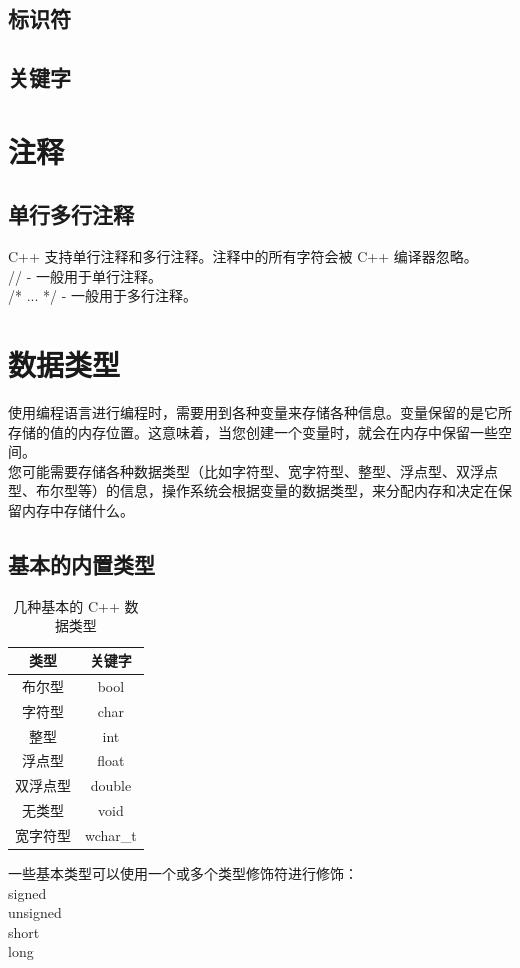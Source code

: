 \documentclass[12pt,twiside,a4paper]{ctexbook}
\numberwithin{chapter}{part}
\begin{document}
\section{标识符}

\section{关键字}

\chapter{注释}
\section{单行多行注释}
C++ 支持单行注释和多行注释。注释中的所有字符会被 C++ 编译器忽略。\\
// - 一般用于单行注释。\\
/* ... */ - 一般用于多行注释。

\chapter{数据类型}
使用编程语言进行编程时，需要用到各种变量来存储各种信息。变量保留的是它所存储的值的内存位置。这意味着，当您创建一个变量时，就会在内存中保留一些空间。\\
您可能需要存储各种数据类型（比如字符型、宽字符型、整型、浮点型、双浮点型、布尔型等）的信息，操作系统会根据变量的数据类型，来分配内存和决定在保留内存中存储什么。
\section{基本的内置类型}
\begin{table}[h]
    \centering
    \caption{几种基本的 C++ 数据类型}
    \label{tab:example}
    \begin{tabular}{|c|c|}
    \hline
    \textbf{类型} & \textbf{关键字}\\
    \hline
    布尔型 & bool\\
    \hline
    字符型 & char\\
    \hline
    整型 & int\\
    \hline
    浮点型 & float\\
    \hline
    双浮点型 & double\\
    \hline
    无类型 & void\\
    \hline
    宽字符型 & wchar\_t\\
    \hline
    \end{tabular}
\end{table}
一些基本类型可以使用一个或多个类型修饰符进行修饰：\\
signed\\
unsigned\\
short\\
long\\
\end{document}
